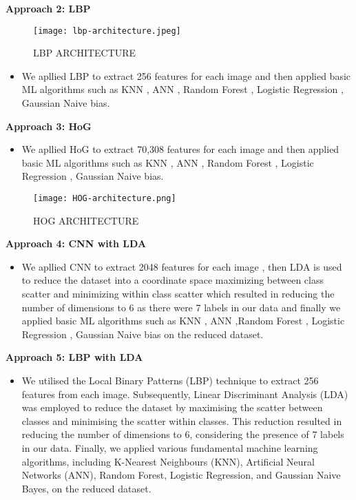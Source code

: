 \documentclass[a4paper]{article}
\theoremstyle{plain}
\theoremstyle{definition}
\begin{document}
\textbf{Approach 2: LBP}\vspace{3pt}
\begin{figure}[htbp]
                \centering
                \texttt{[image: lbp-architecture.jpeg]} %
                \caption{LBP ARCHITECTURE}
                \label{fig:example}
            \end{figure}
 \begin{itemize}
 \item We apllied LBP to extract 256 features for each image and then applied basic ML algorithms such as KNN , ANN , Random Forest , Logistic Regression , Gaussian Naive bias.
 \end{itemize}
 
\textbf{Approach 3: HoG}\vspace{3pt}
 \begin{itemize}
 \item We apllied HoG to extract 70,308 features for each image and then applied basic ML algorithms such as KNN , ANN , Random Forest , Logistic Regression , Gaussian Naive bias.
 \end{itemize}
\begin{figure}[htbp]
                \centering
                \texttt{[image: HOG-architecture.png]} %
                \caption{HOG ARCHITECTURE}
                \label{fig:example}
                \end{figure}
\textbf{Approach 4: CNN with LDA}\vspace{3pt}
 \begin{itemize}
 \item We apllied CNN to extract 2048 features for each image , then LDA is used to reduce the dataset into a coordinate space maximizing between class scatter and minimizing within class scatter which resulted in reducing the number of dimensions to 6 as there were 7 labels in our data and finally we applied basic ML algorithms such as KNN , ANN ,Random Forest , Logistic Regression , Gaussian Naive bias on the reduced dataset.
 \end{itemize}
\textbf{Approach 5: LBP with LDA}\vspace{3pt}
 \begin{itemize}
 \item We utilised the Local Binary Patterns (LBP) technique to extract 256 features from each image. Subsequently, Linear Discriminant Analysis (LDA) was employed to reduce the dataset by maximising the scatter between classes and minimising the scatter within classes. This reduction resulted in reducing the number of dimensions to 6, considering the presence of 7 labels in our data. Finally, we applied various fundamental machine learning algorithms, including K-Nearest Neighbours (KNN), Artificial Neural Networks (ANN), Random Forest, Logistic Regression, and Gaussian Naive Bayes, on the reduced dataset.
 \end{itemize}
\end{document}
